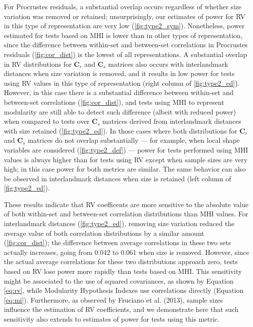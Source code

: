 \documentclass[12pt,twoside]{report}
\begin{document}
For Procrustes residuals, a substantial overlap occurs regardless of
whether size variation was removed or retained; unsurprisingly, our
estimates of power for RV in this type of representation are very low
(\autoref{fig:type2_sym}). Nonetheless, power estimated for tests based
on MHI is lower than in other types of representation, since the
difference between within-set and between-set correlations in Procrustes
residuals (\autoref{fig:cor_dist}) is the lowest of all representations.
A substantial overlap in RV distributions for $\mathbf{C}_r$ and
$\mathbf{C}_s$ matrices also occurs with interlandmark distances when
size variation is removed, and it results in low power for tests using
RV values in this type of representation (right column of
\autoref{fig:type2_ed}). However, in this case there is a substantial
difference between within-set and between-set correlations
(\autoref{fig:cor_dist}), and tests using MHI to represent modularity
are still able to detect such difference (albeit with reduced power)
when compared to tests over $\mathbf{C}_s$ matrices derived from
interlandmark distances with size retained (\autoref{fig:type2_ed}). In
those cases where both distributions for $\mathbf{C}_r$ and
$\mathbf{C}_s$ matrices do not overlap substantially --- for example,
when local shape variables are considered (\autoref{fig:type2_def}) ---
power for tests performed using MHI values is always higher than for
tests using RV except when sample sizes are very high; in this case
power for both metrics are similar. The same behavior can also be
observed in interlandmark distances when size is retained (left column
of \autoref{fig:type2_ed}).

These results indicate that RV coefficents are more sensitive to the
absolute value of both within-set and between-set correlation
distributions than MHI values. For interlandmark distances
(\autoref{fig:type2_ed}), removing size variation reduced the average
value of both correlation distributions by a similar amount
(\autoref{fig:cor_dist}); the difference between average correlations in
these two sets actually increases, going from 0.042 to 0.061 when size
is removed. However, since the actual average correlations for these two
distributions approach zero, tests based on RV lose power more rapidly
than tests based on MHI. This sensitivity might be associated to the use
of squared covariances, as shown by Equation \ref{eq:rv}, while
Modularity Hypothesis Indexes use correlations directly (Equation
\ref{eq:mi}). Furthermore, as observed by Fruciano et al. (2013), sample
sizes influence the estimation of RV coefficients, and we demonstrate
here that such sensitivity also extends to estimates of power for tests
using this metric.
\end{document}
